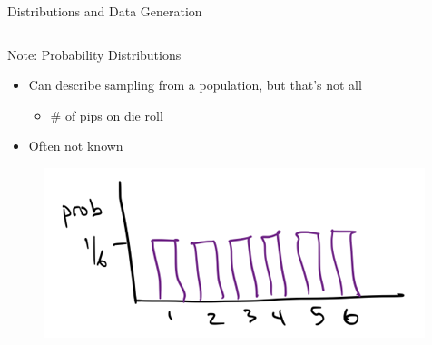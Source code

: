 \documentclass[aspectratio=169]{../latex_main/tntbeamer}  %
\begin{document}
\begin{frame}{Distributions and Data Generation}
\begin{columns}
	        
	        \begin{column}{.3\textwidth}
	            Note: Probability Distributions
	            \begin{itemize}
	                \item Can describe sampling from a population, but that’s not all
	                \begin{itemize}
	                    \item \# of pips on die roll
	                \end{itemize}
	                \item Often not known
	            \end{itemize}
                \begin{figure}
                    \includegraphics[scale=.5]{Bild12}
                \end{figure}
	        \end{column}
	    \end{columns}
	    
	\end{frame}
	
\end{document}
